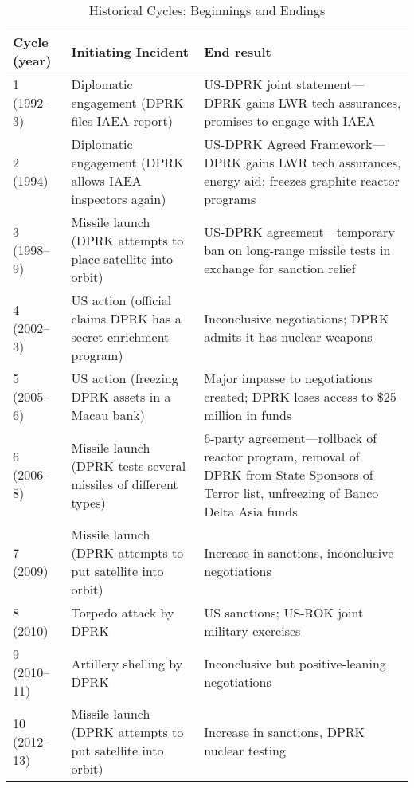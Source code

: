 \begin{table}[H]
	\caption{Historical Cycles: Beginnings and Endings}
	\small
	\begin{tabular}{|l|p{5.75cm}|p{6cm}|}
	\hline
	Cycle (year) & Initiating Incident & End result \\ 
	\hline
	1 (1992--3) & Diplomatic engagement (DPRK files IAEA report) & US-DPRK joint statement---DPRK gains LWR tech assurances, promises to engage with IAEA \\ 
	\hline
	2 (1994) & Diplomatic engagement (DPRK allows IAEA inspectors again) & US-DPRK Agreed Framework---DPRK gains LWR tech assurances, energy aid; freezes graphite reactor programs \\ 
	\hline
	3 (1998--9) & Missile launch (DPRK attempts to place satellite into orbit) & US-DPRK agreement---temporary ban on long-range missile tests in exchange for sanction relief \\ 
	\hline
	4 (2002--3) & US action (official claims DPRK has a secret enrichment program) & Inconclusive negotiations; DPRK admits it has nuclear weapons \\ 
	\hline
	5 (2005--6) & US action (freezing DPRK assets in a Macau bank) & Major impasse to negotiations created; DPRK loses access to \$25 million in funds \\ 
	\hline
	6 (2006--8) & Missile launch (DPRK tests several missiles of different types) & 6-party agreement---rollback of reactor program, removal of DPRK from State Sponsors of Terror list, unfreezing of Banco Delta Asia funds \\ 
	\hline
	7 (2009) & Missile launch (DPRK attempts to put satellite into orbit) & Increase in sanctions, inconclusive negotiations \\ 
	\hline
	8 (2010) & Torpedo attack by DPRK & US sanctions; US-ROK joint military exercises \\ 
	\hline
	9 (2010--11) & Artillery shelling by DPRK & Inconclusive but positive-leaning negotiations \\ 
	\hline
	10 (2012--13) & Missile launch (DPRK attempts to put satellite into orbit) & Increase in sanctions, DPRK nuclear testing \\
	\hline
	\end{tabular}
\end{table}

